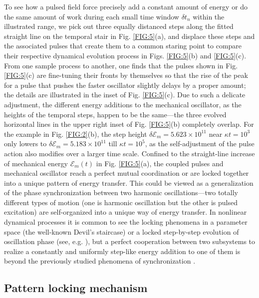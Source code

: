 \documentclass[a4paper,fleqn]{cas-dc}
\begin{document}
To see how a pulsed field force precisely add a constant amount of energy or do the same amount of work during each small time window $\delta t_n$ within the illustrated range, we pick out three equally distanced steps along the fitted straight line on the temporal stair in Fig. \ref{FIG:5}(a), and displace these steps and the associated pulses that create them to a common staring point to compare their respective dynamical evolution process in Figs. \ref{FIG:5}(b) and \ref{FIG:5}(c). From one sample process to another, one finds that the pulses shown in Fig. \ref{FIG:5}(c) are fine-tuning their fronts by themselves so that the rise of the peak for a pulse that pushes the faster oscillator slightly delays by a proper amount; the details are illustrated in the inset of Fig. \ref{FIG:5}(c). Due to such a delicate adjustment, the different energy additions to the mechanical oscillator, as the heights of the temporal steps, happen to be the same---the three evolved horizontal lines in the upper right inset of Fig. \ref{FIG:5}(b) completely overlap. For the example in Fig. \ref{FIG:2}(b), the step height $\delta\mathcal{E}_m=5.623\times 10^{11}$ near $\kappa t=10^3$ only lowers to $\delta\mathcal{E}_m=5.183\times 10^{11}$ till $\kappa t=10^5$, as the self-adjustment of the pulse action also modifies over a larger time scale. Confined to the straight-line increase of mechanical energy $\mathcal{E}_m(t)$ in Fig. \ref{FIG:5}(a), the coupled pulses and mechanical oscillator reach a perfect mutual coordination or are locked together into a unique pattern of energy transfer. This could be viewed as a generalization of the phase synchronization \cite{pikovsky2002synchronization, acebron2005kuramoto,boccaletti2018synchronization} between two harmonic oscillations---two totally different types of motion (one is harmonic oscillation but the other is pulsed excitation) are self-organized into a unique way of energy transfer.  
In nonlinear dynamical processes it is common to see the locking phenomena in a parameter space (the well-known Devil's staircase) or a locked step-by-step evolution of oscillation phase (see, e.g. \cite{pikovsky2002synchronization}), but a perfect cooperation between two subsystems to realize a constantly and uniformly step-like energy addition to one of them is beyond the previously studied phenomena of synchronization \cite{pikovsky2002synchronization,boccaletti2018synchronization}.

\subsection{Pattern locking mechanism}
\end{document}
